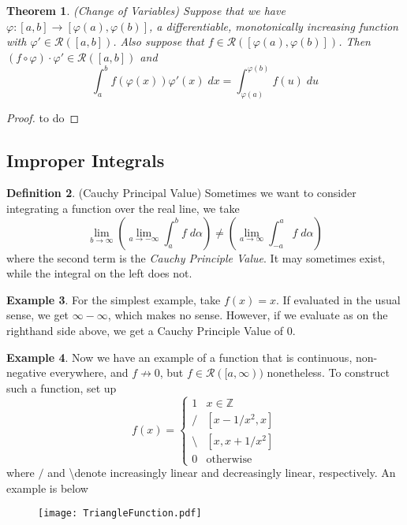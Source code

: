 \documentclass[12pt]{article}
\theoremstyle{plain}
\newtheorem{thm}{Theorem}[subsection]
\theoremstyle{definition}
\newtheorem{defn}[thm]{Definition}
\newtheorem{ex}[thm]{Example}
\theoremstyle{remark}
\begin{document}
\begin{thm}\emph{(Change of Variables)}
Suppose that we have $\varphi: [a,b] \rightarrow [\varphi(a), \varphi(b)]$, a differentiable, monotonically increasing function with $\varphi'\in\mathscr{R}([a,b])$. Also suppose that $f\in\mathscr{R}([\varphi(a),\varphi(b)])$. Then $(f\circ \varphi)\cdot\varphi' \in \mathscr{R}([a,b])$ and
\[
    \int^b_a f\left(\varphi(x)\right) \varphi'(x)\;dx
    = \int^{\varphi(b)}_{\varphi(a)} f(u)\;du
\]
\end{thm}
\begin{proof}
   to do 
\end{proof}


\newpage
\subsection{Improper Integrals}

\begin{defn}
(Cauchy Principal Value) Sometimes we want to consider integrating a function over the real line, we take 
\[
    \lim_{b\rightarrow\infty}
    \left(\lim_{a\rightarrow-\infty} \int^b_a f\;d\alpha
    \right) \neq 
    \left(\lim_{a\rightarrow\infty} \int^a_{-a} f\;d\alpha
    \right)
\]
where the second term is the \emph{Cauchy Principle Value}. It may sometimes exist, while the integral on the left does not. 
\end{defn}

\begin{ex}
For the simplest example, take $f(x)=x$. If evaluated in the usual sense, we get $\infty-\infty$, which makes no sense. However, if we evaluate as on the righthand side above, we get a Cauchy Principle Value of $0$.
\end{ex}

\begin{ex}
Now we have an example of a function that is continuous, non-negative everywhere, and $f\not\rightarrow 0$, but $f\in\mathscr{R}([a,\infty))$ nonetheless.
To construct such a function, set up
\[
    f(x) =
    \begin{cases}
        1 & x\in\mathbb{Z} \\
        / & [x - 1/x^2, x] \\
        \text{\textbackslash} & [x, x + 1/x^2] \\
        0 & \text{otherwise}
    \end{cases}
\]
where $/$ and \textbackslash denote increasingly linear and decreasingly linear, respectively. An example is below
\begin{figure}[h!]
   \centering
   \texttt{[image: TriangleFunction.pdf]}
\end{figure}
\end{ex}
\end{document}

